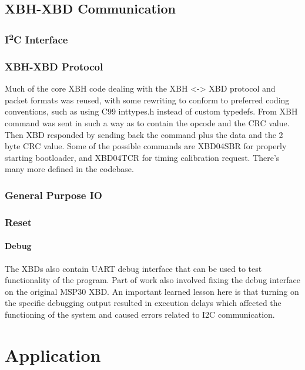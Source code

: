 \documentclass[twoside,11pt]{cergdoc}
\newcommand{\ITwoC}{I\textsuperscript{2}C }
\begin{document}
  \section{XBH-XBD Communication}
    \subsection{\ITwoC Interface}
    \subsection{XBH-XBD Protocol}
Much of the core XBH code dealing
with the XBH <-> XBD protocol and packet
formats was reused, with some rewriting to
conform to preferred coding conventions,
such as using C99 inttypes.h instead of
custom typedefs. From XBH command was
sent in such a way as to contain the opcode
and the CRC value. Then XBD responded
by sending back the command plus the data
and the 2 byte CRC value. Some of the
possible commands are XBD04SBR for
properly starting bootloader, and
XBD04TCR for timing calibration request.
There’s many more defined in the codebase.



    \subsection{General Purpose IO}
    \subsection{Reset}
    \subsubsection{Debug}
The XBDs also contain UART debug interface that can be used
to test functionality of the program. Part of work also involved
fixing the debug interface on the original MSP30 XBD. An
important learned lesson here is that turning on the specific
debugging output resulted in execution delays which affected
the functioning of the system and caused errors related to I2C
communication.


\chapter{Application}
\end{document}

